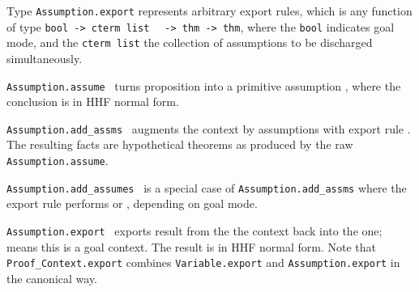 \begin{isabellebody}
\begin{isamarkuptext}
  \begin{description}

  \item Type \verb|Assumption.export| represents arbitrary export
  rules, which is any function of type \verb|bool -> cterm list|\isasep\isanewline%
\verb|  -> thm -> thm|, where the \verb|bool| indicates goal mode,
  and the \verb|cterm list| the collection of assumptions to be
  discharged simultaneously.

  \item \verb|Assumption.assume|~ turns proposition  into a primitive assumption , where the
  conclusion  is in HHF normal form.

  \item \verb|Assumption.add_assms|~ augments the context
  by assumptions  with export rule .  The
  resulting facts are hypothetical theorems as produced by the raw
  \verb|Assumption.assume|.

  \item \verb|Assumption.add_assumes|~ is a special case of
  \verb|Assumption.add_assms| where the export rule performs  or , depending on goal
  mode.

  \item \verb|Assumption.export|~
  exports result  from the the  context
  back into the  one;  means
  this is a goal context.  The result is in HHF normal form.  Note
  that \verb|Proof_Context.export| combines \verb|Variable.export|
  and \verb|Assumption.export| in the canonical way.


\end{description}
\end{isamarkuptext}
\end{isabellebody}
